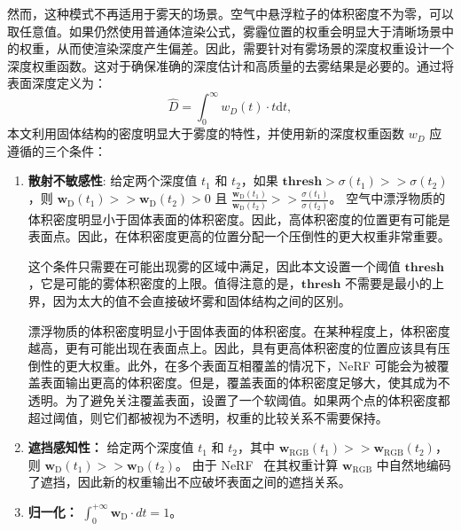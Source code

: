 然而，这种模式不再适用于雾天的场景。空气中悬浮粒子的体积密度不为零，可以取任意值。如果仍然使用普通体渲染公式，雾霾位置的权重会明显大于清晰场景中的权重，从而使渲染深度产生偏差。因此，需要针对有雾场景的深度权重设计一个深度权重函数。这对于确保准确的深度估计和高质量的去雾结果是必要的。通过将表面深度定义为：
\begin{equation}
    \hat{D} =\int_0^\infty w_D(t)\cdot t\text{d}t,
\end{equation}
本文利用固体结构的密度明显大于雾度的特性，并使用新的深度权重函数 $w_D$ 应遵循的三个条件：
\begin{enumerate}
    \item \textbf{散射不敏感性}: 给定两个深度值 $t_1$ 和 $t_2$，如果 $\mathbf{thresh} > \sigma (t_1) >> \sigma (t_2)$，则 $ \mathbf{w}_\text{D}(t_1) >> \mathbf{w}_\text{D}(t_2) > 0$ 且 $\frac{\mathbf{w}_\text{D}(t_1)}{\mathbf{w}_\text{D}(t_2)} >> \frac{\sigma (t_1)}{\sigma (t_2)}$。
空气中漂浮物质的体积密度明显小于固体表面的体积密度。因此，高体积密度的位置更有可能是表面点。因此，在体积密度更高的位置分配一个压倒性的更大权重非常重要。

这个条件只需要在可能出现雾的区域中满足，因此本文设置一个阈值 $\mathbf{thresh}$，它是可能的雾体积密度的上限。值得注意的是，$\mathbf{thresh}$ 不需要是最小的上界，因为太大的值不会直接破坏雾和固体结构之间的区别。

漂浮物质的体积密度明显小于固体表面的体积密度。在某种程度上，体积密度越高，更有可能出现在表面点上。因此，具有更高体积密度的位置应该具有压倒性的更大权重。此外，在多个表面互相覆盖的情况下，NeRF 可能会为被覆盖表面输出更高的体积密度。但是，覆盖表面的体积密度足够大，使其成为不透明。为了避免关注覆盖表面，设置了一个软阈值。如果两个点的体积密度都超过阈值，则它们都被视为不透明，权重的比较关系不需要保持。

\item \textbf{遮挡感知性：} 给定两个深度值 $t_1$ 和 $t_2$，其中 $\mathbf{w}_\text{RGB}(t_1) >> \mathbf{w}_\text{RGB}(t_2)$，则 $ \mathbf{w}_\text{D}(t_1) >> \mathbf{w}_\text{D}(t_2)$。
由于 NeRF~\cite{mildenhall_nerf_2020} 在其权重计算 $\mathbf{w}_\text{RGB}$ 中自然地编码了遮挡，因此新的权重输出不应破坏表面之间的遮挡关系。


\item \textbf{归一化：} $ \int_0^{+\infty} \mathbf{w}_\text{D} \cdot {d}t = 1 $。
\end{enumerate}

